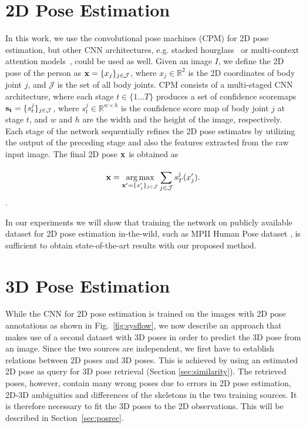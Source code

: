 \documentclass[10pt,journal,compsoc]{IEEEtran}
\makeatletter
\newcommand*{\eg}{e.g.\@\xspace}
\DeclareMathOperator*{\argmax}{arg\,max}
\makeatother
\begin{document}
\section{2D Pose Estimation}\label{sec:2DPose}
In this work, we use the convolutional pose machines (CPM) \cite{wei2016convolutional} for 2D pose estimation, but other CNN architectures, \eg stacked hourglass~\cite{newell2016eccv} or multi-context attention models~\cite{chu2017CVPRmulti}, could be used as well. Given an image $I$, we define the 2D pose of the person
 as $\bold{x} = \{x_j\}_{j\in \mathcal{J}}$, where $x_j \in \mathbb{R}^2$ is the 2D coordinates
of body joint $j$, and $\mathcal{J}$ is the set of all body joints. CPM consists of a multi-staged
CNN architecture, where each stage $t \in \{1 \dots T\}$ produces a set of confidence scoremaps $\bold{s_t} = \{s^j_t\}_{j \in \mathcal{J}}$, 
where  $s^j_t \in \mathbb{R}^{w \times h}$ is the confidence score map of body joint $j$ at 
stage $t$, and $w$ and $h$ are the width and the height of the image, respectively. Each stage of the network 
sequentially refines the 2D pose estimates by utilizing the output of the preceding stage and also the features extracted 
from the raw input image. The final 2D pose $\bold{x}$ is obtained as 

\begin{equation}
\bold{x} = \argmax_{\bold{x'} = \{x'_{j}\}_{j\in \mathcal{J}}}  \sum_{j \in \mathcal{J}}^{} s^j_{T}(x'_j).
\end{equation}.

In our experiments we will show that training the network on publicly available dataset for 2D pose estimation in-the-wild, 
such as MPII Human Pose dataset \cite{andriluka14cvpr}, is sufficient to obtain state-of-the-art results with our proposed method.

\section{3D Pose Estimation}
While the CNN for 2D pose estimation is trained on the images with 2D pose annotations as shown in Fig.~\ref{fig:sysflow}, 
we now describe an approach that makes use of a second dataset with 3D poses in order to predict the 3D pose from an image. 
Since the two sources are independent, we first have to establish relations between 2D poses and 3D poses.
This is achieved by using an estimated 2D pose as query for 3D pose retrieval (Section \ref{sec:similarity}). 
The retrieved poses, however, contain many wrong poses due to errors in 2D pose estimation, 2D-3D ambiguities
and differences of the skeletons in the two training sources. It is therefore necessary to fit the 3D poses to the 2D observations. 
This will be described in Section~\ref{sec:posrec}.
\end{document}
